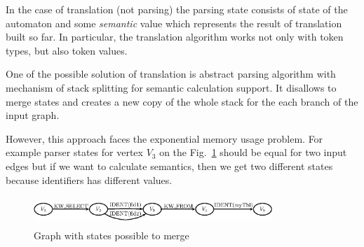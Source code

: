
In the case of translation (not parsing) the parsing state consists of state of the automaton and some
\emph{semantic} value which represents the result of translation built so far. In particular,
the translation algorithm works not only with token types, but also token values. 

%


One of the possible solution of translation is abstract parsing algorithm with mechanism of stack 
splitting for semantic calculation support. It disallows to merge states and creates a new 
copy of the whole stack for the each branch of the input graph.

However, this approach faces the exponential memory usage problem. 
For example parser states for vertex $V_3$ on the Fig.~\ref{pic4} should be equal for two input edges
but if we want to calculate semantics, then we get two different states because identifiers has 
different values.

\begin{figure}
    \begin{center}
        \includegraphics[width=9cm,height=1.1cm]{graphs/states_example.eps}
        \caption{Graph with states possible to merge}
        \label{pic4}
    \end{center}
\end{figure}

